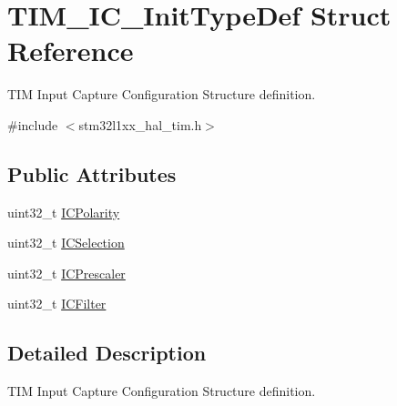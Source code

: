 \hypertarget{struct_t_i_m___i_c___init_type_def}{\section{T\-I\-M\-\_\-\-I\-C\-\_\-\-Init\-Type\-Def Struct Reference}
\label{struct_t_i_m___i_c___init_type_def}
}


T\-I\-M Input Capture Configuration Structure definition.  




{\ttfamily \#include $<$stm32l1xx\-\_\-hal\-\_\-tim.\-h$>$}

\subsection*{Public Attributes}
\begin{DoxyCompactItemize}
\item 
uint32\-\_\-t \hyperlink{struct_t_i_m___i_c___init_type_def_ab122383ebc0926c49a814546471da9b3}{I\-C\-Polarity}
\item 
uint32\-\_\-t \hyperlink{struct_t_i_m___i_c___init_type_def_aad80556490de79727ba1269c851e9724}{I\-C\-Selection}
\item 
uint32\-\_\-t \hyperlink{struct_t_i_m___i_c___init_type_def_a452a4a459b6f7b7c478db032de9b0d72}{I\-C\-Prescaler}
\item 
uint32\-\_\-t \hyperlink{struct_t_i_m___i_c___init_type_def_ae8432aa11b5495b252ac7ae299eabb32}{I\-C\-Filter}
\end{DoxyCompactItemize}


\subsection{Detailed Description}
T\-I\-M Input Capture Configuration Structure definition. 

